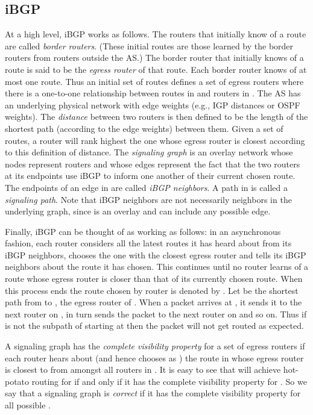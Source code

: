 \documentclass[11pt,letterpaper]{article}
\theoremstyle{definition}
\newcounter{note}[section]
\begin{document}
\subsection{iBGP}
At a high level, iBGP works as follows.
The routers that initially know of a route are called {\em border routers}.
(These initial routes are those learned by the border routers from
routers outside the AS.)
The border router that initially knows of a route
is said to be the {\em egress router} of that route.
Each border router knows of at most one route.
Thus an initial set of routes  defines a set of egress routers  where
there is a one-to-one relationship between routes in  and routers
in .
The AS has an underlying physical network with edge weights (e.g., IGP
distances or OSPF weights).
The {\em distance} between two routers is then defined to be the
length of the shortest path (according to the edge weights) between them.
Given a set of routes, a router will rank highest the one whose
egress router is closest according to this definition of distance.
The {\em signaling graph}  is an overlay network whose nodes represent
routers and whose edges represent the fact that
the two routers at its endpoints use iBGP to inform one another of
their current chosen route.
The endpoints of an edge in  are called {\em iBGP neighbors}.
A path in  is called a {\em signaling path}.  Note that iBGP neighbors are not necessarily neighbors in the underlying graph, since  is an overlay and can include any possible edge.

Finally, iBGP can be thought of as working as follows:
in an asynchronous fashion, each router considers all the latest routes
it has heard about from its iBGP neighbors,
chooses the one with the closest egress router and tells its
iBGP neighbors about the route it has chosen.
This continues until no router learns of a route whose egress router is
closer than that of its currently chosen route.
When this process ends the route chosen by router  is denoted by .
Let  be
the shortest path from  to , the egress router of .
When a packet arrives at , it sends it to the next router  on ,
 in turn sends the packet to the next router on  and so on.
Thus if  is not the subpath of  starting at  then the
packet will not get routed as  expected.

A signaling graph  has the \emph{complete visibility property} for a set of egress routers  if each router  hears about (and hence
chooses as ) the route in  whose egress router  is closest to
 from amongst all routers in .  It is easy to see that  will achieve hot-potato routing for  if and only if it has the complete visibility property for .  So we say that a signaling graph is \emph{correct} if it has the complete visibility property for all possible .
\end{document}
